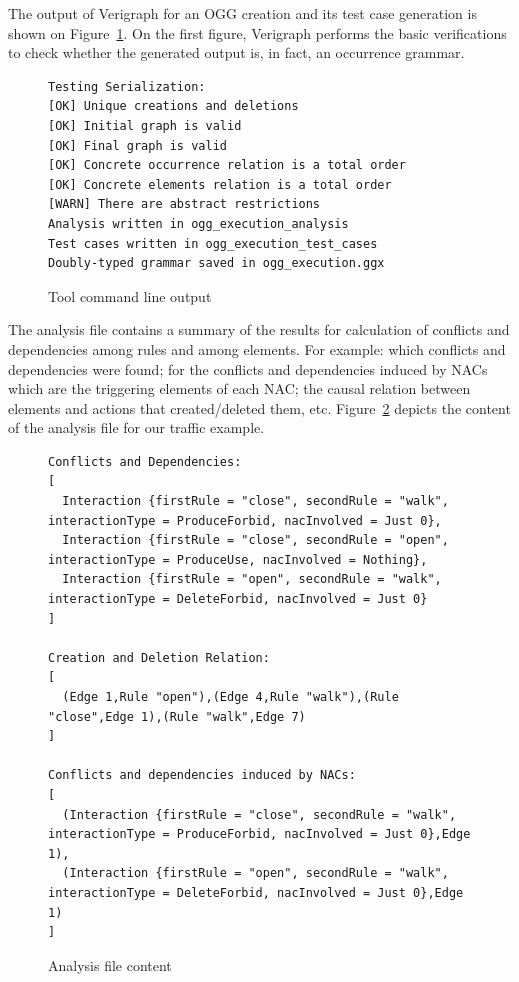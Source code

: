 The output of Verigraph for an OGG creation and its test case generation is shown on Figure~\ref{fig:tests:checklist}. On the first figure, Verigraph performs the basic verifications to check whether the generated output is, in fact, an occurrence grammar.

\begin{figure}[!ht]
\caption{Tool command line output}
\begin{verbatim}
Testing Serialization:
[OK] Unique creations and deletions
[OK] Initial graph is valid
[OK] Final graph is valid
[OK] Concrete occurrence relation is a total order
[OK] Concrete elements relation is a total order
[WARN] There are abstract restrictions
Analysis written in ogg_execution_analysis
Test cases written in ogg_execution_test_cases
Doubly-typed grammar saved in ogg_execution.ggx
\end{verbatim}
  \label{fig:tests:checklist}
\end{figure}

The analysis file contains a summary of the results for calculation of conflicts and dependencies among rules and among elements. For example: which conflicts and dependencies were found; for the conflicts and dependencies induced by NACs which are the triggering elements of each NAC; the causal relation between elements and actions that created/deleted them, etc. Figure~\ref{fig:tests:analysis} depicts the content of the analysis file for our traffic example.

\begin{figure}[!ht]
\caption{Analysis file content}
\begin{verbatim}
Conflicts and Dependencies:
[
  Interaction {firstRule = "close", secondRule = "walk", interactionType = ProduceForbid, nacInvolved = Just 0},
  Interaction {firstRule = "close", secondRule = "open", interactionType = ProduceUse, nacInvolved = Nothing},
  Interaction {firstRule = "open", secondRule = "walk", interactionType = DeleteForbid, nacInvolved = Just 0}
]

Creation and Deletion Relation:
[
  (Edge 1,Rule "open"),(Edge 4,Rule "walk"),(Rule "close",Edge 1),(Rule "walk",Edge 7)
]

Conflicts and dependencies induced by NACs:
[
  (Interaction {firstRule = "close", secondRule = "walk", interactionType = ProduceForbid, nacInvolved = Just 0},Edge 1),
  (Interaction {firstRule = "open", secondRule = "walk", interactionType = DeleteForbid, nacInvolved = Just 0},Edge 1)
]
\end{verbatim}
  \label{fig:tests:analysis}
\end{figure}


